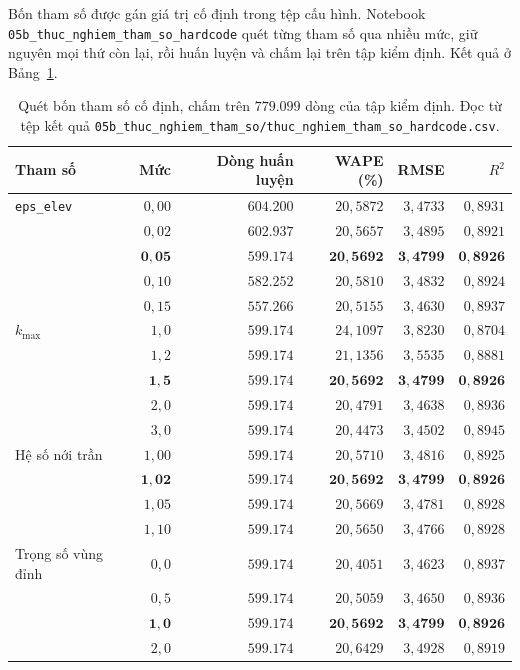 \documentclass[12pt, a4paper]{report}
\begin{document}
Bốn tham số được gán giá trị cố định trong tệp cấu hình. Notebook
\texttt{05b\_thuc\_nghiem\_tham\_so\_hardcode} quét từng tham số qua nhiều mức, giữ nguyên mọi thứ
còn lại, rồi huấn luyện và chấm lại trên tập kiểm định. Kết quả ở Bảng~\ref{tab:quet_tham_so}.

\begin{table}[htbp]
\centering
\caption{Quét bốn tham số cố định, chấm trên $779.099$ dòng của tập kiểm định. Đọc từ tệp kết
quả \texttt{05b\_thuc\_nghiem\_tham\_so/thuc\_nghiem\_tham\_so\_hardcode.csv}.}
\label{tab:quet_tham_so}
\small
\begin{tabular}{l r r r r r}
\toprule
\textbf{Tham số} & \textbf{Mức} & \textbf{Dòng huấn luyện} & \textbf{WAPE (\%)} & \textbf{RMSE} & \textbf{$R^2$} \\
\midrule
\texttt{eps\_elev}
 & $0{,}00$ & $604.200$ & $20{,}5872$ & $3{,}4733$ & $0{,}8931$ \\
 & $0{,}02$ & $602.937$ & $20{,}5657$ & $3{,}4895$ & $0{,}8921$ \\
 & $\mathbf{0{,}05}$ & $\mathbf{599.174}$ & $\mathbf{20{,}5692}$ & $\mathbf{3{,}4799}$ & $\mathbf{0{,}8926}$ \\
 & $0{,}10$ & $582.252$ & $20{,}5810$ & $3{,}4832$ & $0{,}8924$ \\
 & $0{,}15$ & $557.266$ & $20{,}5155$ & $3{,}4630$ & $0{,}8937$ \\
\midrule
$k_{\max}$
 & $1{,}0$ & $599.174$ & $24{,}1097$ & $3{,}8230$ & $0{,}8704$ \\
 & $1{,}2$ & $599.174$ & $21{,}1356$ & $3{,}5535$ & $0{,}8881$ \\
 & $\mathbf{1{,}5}$ & $\mathbf{599.174}$ & $\mathbf{20{,}5692}$ & $\mathbf{3{,}4799}$ & $\mathbf{0{,}8926}$ \\
 & $2{,}0$ & $599.174$ & $20{,}4791$ & $3{,}4638$ & $0{,}8936$ \\
 & $3{,}0$ & $599.174$ & $20{,}4473$ & $3{,}4502$ & $0{,}8945$ \\
\midrule
Hệ số nới trần
 & $1{,}00$ & $599.174$ & $20{,}5710$ & $3{,}4816$ & $0{,}8925$ \\
 & $\mathbf{1{,}02}$ & $\mathbf{599.174}$ & $\mathbf{20{,}5692}$ & $\mathbf{3{,}4799}$ & $\mathbf{0{,}8926}$ \\
 & $1{,}05$ & $599.174$ & $20{,}5669$ & $3{,}4781$ & $0{,}8928$ \\
 & $1{,}10$ & $599.174$ & $20{,}5650$ & $3{,}4766$ & $0{,}8928$ \\
\midrule
Trọng số vùng đỉnh
 & $0{,}0$ & $599.174$ & $20{,}4051$ & $3{,}4623$ & $0{,}8937$ \\
 & $0{,}5$ & $599.174$ & $20{,}5059$ & $3{,}4650$ & $0{,}8936$ \\
 & $\mathbf{1{,}0}$ & $\mathbf{599.174}$ & $\mathbf{20{,}5692}$ & $\mathbf{3{,}4799}$ & $\mathbf{0{,}8926}$ \\
 & $2{,}0$ & $599.174$ & $20{,}6429$ & $3{,}4928$ & $0{,}8919$ \\
\bottomrule
\end{tabular}
\end{table}
\end{document}
